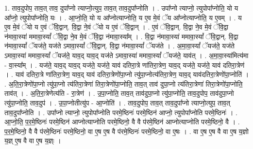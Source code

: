 \documentclass[17pt]{extarticle}
\begin{document}
1. ताव॒दुपोप॒ ताव॒त् ताव॒ दुपा᳚प्नो त्याप्नो॒त्युप॒ ताव॒त् ताव॒दुपा᳚प्नोति । . उपा᳚प्नो त्याप्नो॒ त्युपोपा᳚प्नोति॒ यो य आ᳚प्नो॒ त्युपोपा᳚प्नोति॒ यः । . आ॒प्नो॒ति॒ यो य आ᳚प्नोत्याप्नोति॒ य ए॒व मे॒वं ॅय आ᳚प्नोत्याप्नोति॒ य ए॒वम् । . य ए॒व मे॒वं ॅयो य ए॒वं ॅवि॒द्वान्. वि॒द्वा ने॒वं ॅयो य ए॒वं ॅवि॒द्वान् । . ए॒वं ॅवि॒द्वान्. वि॒द्वा ने॒व मे॒वं ॅवि॒द्वा न॑मावा॒स्या॑ ममावा॒स्यां᳚ ॅवि॒द्वा ने॒व मे॒वं ॅवि॒द्वा न॑मावा॒स्या᳚म् । . वि॒द्वा न॑मावा॒स्या॑ ममावा॒स्यां᳚ ॅवि॒द्वान्. वि॒द्वा न॑मावा॒स्यां᳚ ॅयज॑ते॒ यज॑ते ऽमावा॒स्यां᳚ ॅवि॒द्वान्. वि॒द्वा न॑मावा॒स्यां᳚ ॅयज॑ते । . अ॒मा॒वा॒स्यां᳚ ॅयज॑ते॒ यज॑ते ऽमावा॒स्या॑ ममावा॒स्यां᳚ ॅयज॑ते॒ याव॒द् याव॒द् यज॑ते ऽमावा॒स्या॑ ममावा॒स्यां᳚ ॅयज॑ते॒ याव॑त् । . अ॒मा॒वा॒स्या॑मित्य॑मा - वा॒स्या᳚म् । . यज॑ते॒ याव॒द् याव॒द् यज॑ते॒ यज॑ते॒ याव॑ दतिरा॒त्रे णा॑तिरा॒त्रेण॒ याव॒द् यज॑ते॒ यज॑ते॒ याव॑ दतिरा॒त्रेण॑ । . याव॑ दतिरा॒त्रे णा॑तिरा॒त्रेण॒ याव॒द् याव॑ दतिरा॒त्रेणो॑पा॒प्नो त्यु॑पा॒प्नोत्य॑तिरा॒त्रेण॒ याव॒द् याव॑दतिरा॒त्रेणो॑पा॒प्नोति॑ । . अ॒ति॒रा॒त्रेणो॑पा॒प्नो त्यु॑पा॒प्नो त्य॑तिरा॒त्रेणा॑ तिरा॒त्रेणो॑पा॒प्नोति॒ ताव॒त् ताव॑ दुपा॒प्नो त्य॑तिरा॒त्रेणा॑ तिरा॒त्रेणो॑पा॒प्नोति॒ ताव॑त् । . अ॒ति॒रा॒त्रेणेत्य॑ति - रा॒त्रेण॑ । . उ॒पा॒प्नोति॒ ताव॒त् ताव॑दुपा॒प्नो त्यु॑पा॒प्नोति॒ ताव॒दुपोप॒ ताव॑दुपा॒प्नो त्यु॑पा॒प्नोति॒ ताव॒दुप॑ । . उ॒पा॒प्नोतीत्यु॑प - आ॒प्नोति॑ । . ताव॒दुपोप॒ ताव॒त् ताव॒दुपा᳚प्नो त्याप्नो॒त्युप॒ ताव॒त् ताव॒दुपा᳚प्नोति । . उपा᳚प्नो त्याप्नो॒ त्युपोपा᳚प्नोति परमे॒ष्ठिनः॑ परमे॒ष्ठिन॑ आप्नो॒ त्युपोपा᳚प्नोति परमे॒ष्ठिनः॑ । . आ॒प्नो॒ति॒ प॒र॒मे॒ष्ठिनः॑ परमे॒ष्ठिन॑ आप्नोत्याप्नोति परमे॒ष्ठिनो॒ वै वै प॑रमे॒ष्ठिन॑ आप्नोत्याप्नोति परमे॒ष्ठिनो॒ वै । . प॒र॒मे॒ष्ठिनो॒ वै वै प॑रमे॒ष्ठिनः॑ परमे॒ष्ठिनो॒ वा ए॒ष ए॒ष वै प॑रमे॒ष्ठिनः॑ परमे॒ष्ठिनो॒ वा ए॒षः । . वा ए॒ष ए॒ष वै वा ए॒ष य॒ज्ञो य॒ज्ञ् ए॒ष वै वा ए॒ष य॒ज्ञ्ः । \newline
\end{document}
